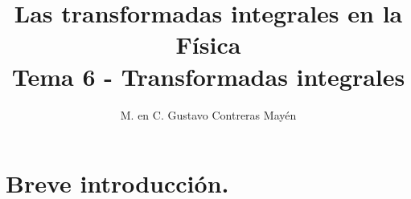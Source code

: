 
\usepackage{apacite}
\title{Las transformadas integrales en la Física \\ \large {Tema 6 - Transformadas integrales} \vspace{-3ex}}
\author{M. en C. Gustavo Contreras Mayén}
\date{ }

\vspace{-4cm}
\maketitle
\fontsize{14}{14}\selectfont
\tableofcontents
\newpage

\section{Breve introducción.}


